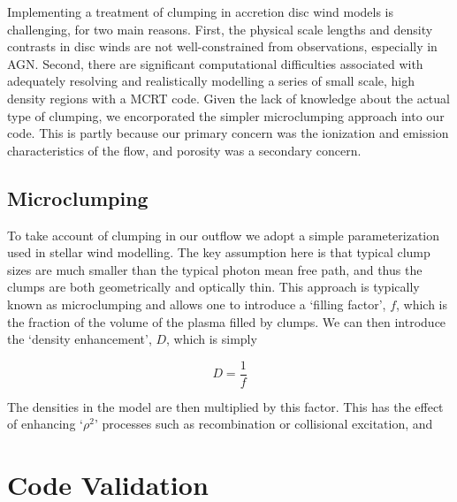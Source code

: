 Implementing a treatment of clumping in accretion disc wind models is challenging, for
two main reasons. First, the physical scale lengths and density contrasts 
in disc winds are not well-constrained from observations, especially in AGN.  
Second, there are significant computational difficulties associated with adequately
resolving and realistically modelling a series of small scale, high density
regions with a MCRT code. Given the lack of knowledge about the actual 
type of clumping, we encorporated the simpler microclumping approach into our code.
This is partly because our primary concern was the ionization and 
emission characteristics of the flow, and porosity was a secondary concern.


\subsection{Microclumping}

To take account of clumping in our outflow we adopt a simple parameterization
used in stellar wind modelling. The key assumption here is that typical clump sizes
are much smaller than the typical photon mean free path, and thus the clumps are 
both geometrically and optically thin. This approach is typically 
known as microclumping and allows one to introduce a `filling factor', $f$, which is the 
fraction of the volume of the plasma filled by clumps. We can then introduce the 
`density enhancement', $D$, which is simply 

\begin{equation}
D = \frac{1}{f}
\end{equation}

The densities in the model are then multiplied by this factor. This has the effect 
of enhancing `$\rho^2$' processes such as recombination or collisional excitation,
and 




\section{Code Validation}








